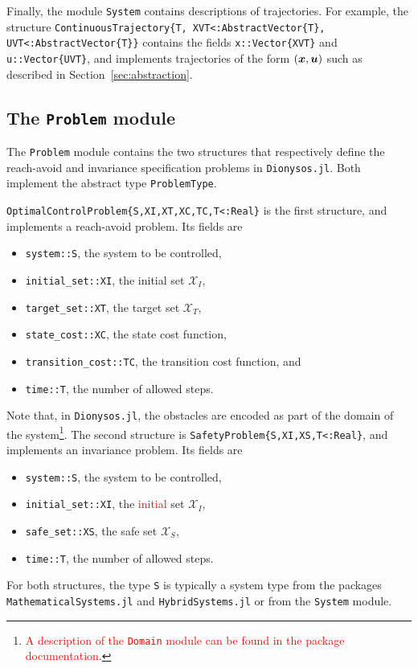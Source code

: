 \documentclass{juliacon}
\begin{document}
\vskip 6pt

Finally, the module \texttt{System} contains descriptions of trajectories. For example, the structure \texttt{ContinuousTrajectory\{T, XVT<:AbstractVector\{T\}, UVT<:AbstractVector\{T\}\}} contains the fields \texttt{x::Vector\{XVT\}} and \texttt{u::Vector\{UVT\}}, and implements trajectories of the form $(\boldsymbol{x}, \boldsymbol{u})$ such as described in Section~\ref{sec:abstraction}.

\subsection{The \texttt{Problem} module}

The \texttt{Problem} module contains the two structures that respectively define the reach-avoid and invariance specification problems in \texttt{Dionysos.jl}. Both implement the abstract type \texttt{ProblemType}.

\vskip 6pt

\texttt{OptimalControlProblem\{S,XI,XT,XC,TC,T<:Real\}} is the first structure, and implements a reach-avoid problem. Its fields are
\begin{itemize}
    \item \texttt{system::S}, the system to be controlled, 
    \item \texttt{initial\_set::XI}, the initial set $\mathcal{X}_I$, 
    \item \texttt{target\_set::XT}, the target set $\mathcal{X}_T$, 
    \item \texttt{state\_cost::XC}, the state cost function, 
    \item \texttt{transition\_cost::TC}, the transition cost function, and
    \item \texttt{time::T}, the number of allowed steps.
\end{itemize}
Note that, in \texttt{Dionysos.jl}, the obstacles are encoded as part of the domain of the system\footnote{\textcolor{red}{A description of the \texttt{Domain} module can be found in the package documentation}.}. The second structure is \texttt{SafetyProblem\{S,XI,XS,T<:Real\}}, and implements an invariance problem. Its fields are 
\begin{itemize}
    \item \texttt{system::S}, the system to be controlled,
    \item \texttt{initial\_set::XI}, the \textcolor{red}{initial} set $\mathcal{X}_I$,
    \item \texttt{safe\_set::XS}, the safe set $\mathcal{X}_S$, 
    \item \texttt{time::T}, the number of allowed steps.
\end{itemize}
For both structures, the type \texttt{S} is typically a system type from the packages \texttt{MathematicalSystems.jl} and \texttt{HybridSystems.jl} or from the \texttt{System} module. 
\end{document}
